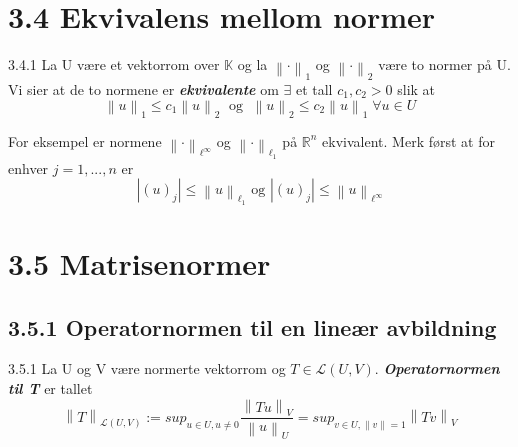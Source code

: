 \documentclass[a4paper,norsk]{article}
\renewcommand{\leq}{\leqslant}
\begin{document}
\section*{3.4 Ekvivalens mellom normer}

\begin{definitionbox}{3.4.1}{}
La U være et vektorrom over $ \mathbb{K} $ og la $ \left\lVert \cdot \right\rVert _1 $ og $ \left\lVert \cdot \right\rVert _2 $ være to normer på U. Vi sier at de to normene er \textbf{\textit{ekvivalente}} om $ \exists $  et tall $ c_1, c_2 > 0 $ slik at 
\[
    \left\lVert u \right\rVert _1 \leq c_1 \left\lVert u \right\rVert _2 \; \text{ og } \; \left\lVert u \right\rVert _2 \leq c_2 \left\lVert u \right\rVert _1 \; \forall u \in U
\]
\end{definitionbox}

For eksempel er normene $ \left\lVert \cdot \right\rVert _{\ell^{\infty}} $ og $ \left\lVert \cdot \right\rVert _{\ell_1} $ på $ \mathbb{R}^n $   ekvivalent. Merk først at for enhver $ j=1, ..., n  $ er
\[
    \left| \left( u \right) _j \right| \leq \left\lVert u \right\rVert _{\ell_1} \text{ og } \left| \left( u \right) _j \right| \leq \left\lVert u \right\rVert _{\ell^{\infty}} 
\]

\section*{3.5 Matrisenormer}

\subsection*{3.5.1 Operatornormen til en lineær avbildning}

\begin{definitionbox}{3.5.1}{}
La U og V være normerte vektorrom og $ T \in \mathcal{L} \left( U, V \right)  $. \textbf{\textit{Operatornormen til T}} er tallet
\[
    \left\lVert T \right\rVert _{\mathcal{L} \left( U, V \right) } := sup_{u \in U, u \neq 0} \frac{ \left\lVert Tu \right\rVert_V  }{ \left\lVert u \right\rVert _U } = sup_{v \in U, \left\lVert v \right\rVert =1} \left\lVert Tv \right\rVert _V
\]
\end{definitionbox}
\end{document}
